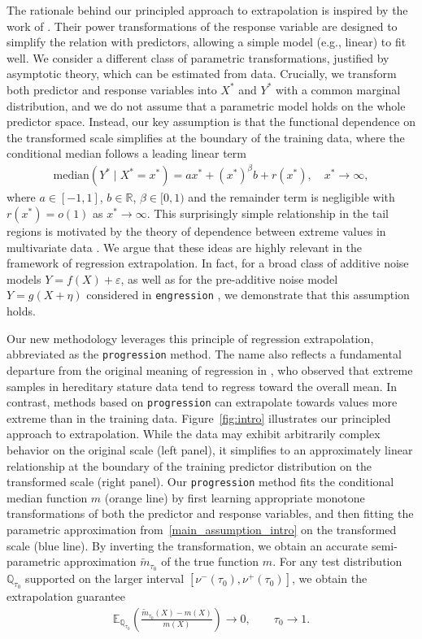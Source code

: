 \documentclass{statsoc}
\theoremstyle{break}
\newcommand{\tauzero}{\tau_0}
\def\M{\text{median}}
\begin{document}
The rationale behind our principled approach to extrapolation is inspired by the work of \cite{box1964}. Their power transformations of the response variable are designed to simplify the relation with predictors, allowing a simple model (e.g., linear) to fit well. 
We consider a different class of parametric transformations, justified by asymptotic theory, which can be estimated from data. 
Crucially, we transform both predictor and response variables into $X^*$ and $Y^*$ with a common marginal distribution, and we do not assume that a parametric model holds on the whole predictor space. Instead, our key assumption is that the functional dependence on the transformed scale simplifies at the boundary of the training data, where the 
conditional median follows a leading linear term
\begin{align}\label{main_assumption_intro}
	\M(Y^* \mid X^* = x^*) = a x^*  +  (x^*)^\beta b  + r(x^*), \quad  x^* \to \infty,
\end{align}
where $a\in [-1,1]$, $b\in \mathbb R$, $\beta \in [0,1)$ and the remainder term is negligible with $r(x^*) = o(1)$ as $x^*\to\infty$.
This surprisingly simple relationship in the tail regions is motivated by the theory of dependence between extreme values in multivariate data \citep{resnick:2007, heffernan:tawn:2004}.   
We argue that these ideas are highly relevant in the framework of regression extrapolation.
In fact, for a broad class of additive noise models $Y = f(X) + \varepsilon$, as well as for the pre-additive noise model $Y = g(X + \eta)$ considered in \texttt{engression} \cite{shen:meinshausen:2023}, we demonstrate that this assumption holds. 


Our new methodology leverages this principle of regression extrapolation, abbreviated as the \texttt{progression} method. The name also reflects a fundamental departure from the original meaning of regression in \cite{gal1886}, who observed that extreme samples in hereditary stature data tend to regress toward the overall mean. In contrast, methods based on \texttt{progression} can extrapolate towards values more extreme than in the training data. 
Figure~\ref{fig:intro} illustrates our principled approach to extrapolation. While the data may exhibit arbitrarily complex behavior on the original scale (left panel), it simplifies to an approximately linear relationship at the boundary of the training predictor distribution on the transformed scale (right panel). 
Our \texttt{progression} method fits the conditional median function $m$ (orange line) by first learning appropriate monotone transformations of both the predictor and response variables, and then fitting the parametric approximation from~\eqref{main_assumption_intro} on the transformed scale (blue line). By inverting the transformation, we obtain an accurate semi-parametric approximation $\tilde m_{\tauzero}$ of the true function $m$.
For any test distribution $\mathbb Q_{\tauzero}$ supported on the larger interval $[\nu^-(\tauzero), \nu^+(\tauzero)]$, we obtain the extrapolation guarantee
\begin{align}
	\mathbb E_{\mathbb Q_{\tauzero}} \left( \frac{\tilde m_{\tauzero}(X)- m(X)}{m(X)} \right) \to 0, \qquad \tauzero \to 1.
\end{align}
\end{document}
